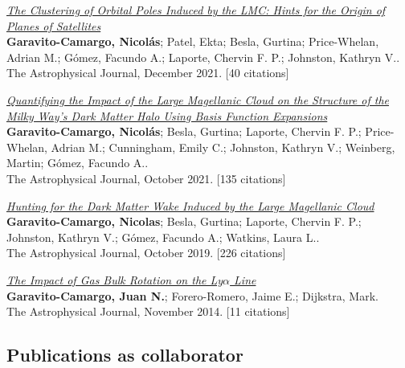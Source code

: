 \documentclass[14pt]{article}
\begin{document}
\begin{etaremune}
\item \textit{\href{https://ui.adsabs.harvard.edu/abs/2021ApJ...923..140G/abstract}{The Clustering of Orbital Poles Induced by the LMC: Hints for the Origin of Planes of Satellites}}\\
  {\small \color{darkgray} \textbf{Garavito-Camargo, Nicolás}; Patel, Ekta; Besla, Gurtina; Price-Whelan, Adrian M.; Gómez, Facundo A.; Laporte, Chervin F. P.; Johnston, Kathryn V..\\
  The Astrophysical Journal, December 2021. [40 citations]}

\item \textit{\href{https://ui.adsabs.harvard.edu/abs/2021ApJ...919..109G/abstract}{Quantifying the Impact of the Large Magellanic Cloud on the Structure of the Milky Way's Dark Matter Halo Using Basis Function Expansions}}\\
  {\small \color{darkgray} \textbf{Garavito-Camargo, Nicolás}; Besla, Gurtina; Laporte, Chervin F. P.; Price-Whelan, Adrian M.; Cunningham, Emily C.; Johnston, Kathryn V.; Weinberg, Martin; Gómez, Facundo A..\\
  The Astrophysical Journal, October 2021. [135 citations]}

\item \textit{\href{https://ui.adsabs.harvard.edu/abs/2019ApJ...884...51G/abstract}{Hunting for the Dark Matter Wake Induced by the Large Magellanic Cloud}}\\
  {\small \color{darkgray} \textbf{Garavito-Camargo, Nicolas}; Besla, Gurtina; Laporte, Chervin F. P.; Johnston, Kathryn V.; Gómez, Facundo A.; Watkins, Laura L..\\
  The Astrophysical Journal, October 2019. [226 citations]}

\item \textit{\href{https://ui.adsabs.harvard.edu/abs/2014ApJ...795..120G/abstract}{The Impact of Gas Bulk Rotation on the Ly$\alpha$ Line}}\\
  {\small \color{darkgray} \textbf{Garavito-Camargo, Juan N.}; Forero-Romero, Jaime E.; Dijkstra, Mark.\\
  The Astrophysical Journal, November 2014. [11 citations]}

\end{etaremune}

\subsection*{Publications as collaborator}
\end{document}
